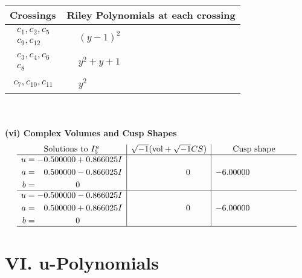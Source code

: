\documentclass[1p]{elsarticle_modified}
\theoremstyle{definition}
\newcommand{\I}{\sqrt{-1}}
\begin{document}
\begin{tabular}{m{50pt}|m{274pt}}
Crossings & \hspace{64pt}Riley Polynomials at each crossing \\
\hline $$\begin{aligned}c_{1},c_{2},c_{5}\\c_{9},c_{12}\end{aligned}$$&$\begin{aligned}
&(y-1)^2
\end{aligned}$\\
\hline $$\begin{aligned}c_{3},c_{4},c_{6}\\c_{8}\end{aligned}$$&$\begin{aligned}
&y^2+y+1
\end{aligned}$\\
\hline $$\begin{aligned}c_{7},c_{10},c_{11}\end{aligned}$$&$\begin{aligned}
&y^2
\end{aligned}$\\
\hline
\end{tabular}\\~\\
\newpage\flushleft \textbf{(vi) Complex Volumes and Cusp Shapes}
$$\begin{array}{c|c|c}  
\text{Solutions to }I^u_{5}& \I (\text{vol} + \sqrt{-1}CS) & \text{Cusp shape}\\
 \hline 
\begin{aligned}
u &= -0.500000 + 0.866025 I \\
a &= \phantom{-}0.500000 - 0.866025 I \\
b &= \phantom{-0.000000 } 0\end{aligned}
 & \phantom{-0.000000 } 0 & -6.00000\phantom{ +0.000000I} \\ \hline\begin{aligned}
u &= -0.500000 - 0.866025 I \\
a &= \phantom{-}0.500000 + 0.866025 I \\
b &= \phantom{-0.000000 } 0\end{aligned}
 & \phantom{-0.000000 } 0 & -6.00000\phantom{ +0.000000I}\\
 \hline 
 \end{array}$$\newpage
\newpage\renewcommand{\arraystretch}{1}
\centering \section*{ VI. u-Polynomials}
\end{document}
